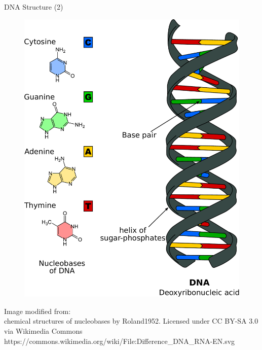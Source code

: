 \documentclass[pdf]{beamer}
\begin{document}
\begin{frame}{DNA Structure (2)}
  \begin{figure}[h]
    \includegraphics[height=0.75\textheight]{images/DNA}
  \end{figure}
  \tiny Image modified from:\\
  \tiny chemical structures of nucleobases by Roland1952. Licensed under CC BY-SA 3.0 via Wikimedia Commons\\
  \tiny https://commons.wikimedia.org/wiki/File:Difference\_DNA\_RNA-EN.svg
\end{frame}
\end{document}
